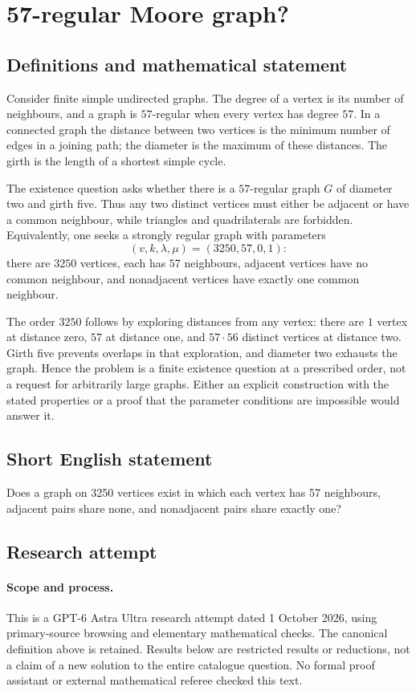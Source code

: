 \documentclass[11pt,a4paper]{article}
\begin{document}
\section*{57-regular Moore graph?}\label{statement}

\subsection{Definitions and mathematical statement}
Consider finite simple undirected graphs. The degree of a vertex is
its number of neighbours, and a graph is $57$-regular when every
vertex has degree $57$. In a connected graph the distance between
two vertices is the minimum number of edges in a joining path;
the diameter is the maximum of these distances. The girth is the
length of a shortest simple cycle.

The existence question asks whether there is a $57$-regular graph
$G$ of diameter two and girth five. Thus any two distinct vertices
must either be adjacent or have a common neighbour, while triangles
and quadrilaterals are forbidden. Equivalently, one seeks a strongly
regular graph with parameters
\[
 (v,k,\lambda,\mu)=(3250,57,0,1):
\]
there are $3250$ vertices, each has $57$ neighbours, adjacent
vertices have no common neighbour, and nonadjacent vertices have
exactly one common neighbour.

The order $3250$ follows by exploring distances from any vertex:
there are $1$ vertex at distance zero, $57$ at distance one, and
$57\cdot56$ distinct vertices at distance two. Girth five prevents
overlaps in that exploration, and diameter two exhausts the graph.
Hence the problem is a finite existence question at a prescribed
order, not a request for arbitrarily large graphs. Either an
explicit construction with the stated properties or a proof that
the parameter conditions are impossible would answer it.
\subsection{Short English statement}
Does a graph on 3250 vertices exist in which each vertex has 57 neighbours, adjacent pairs share none, and nonadjacent pairs share exactly one?
\subsection{Research attempt}
\paragraph{Scope and process.}
This is a GPT-6 Astra Ultra research attempt dated 1 October 2026, using
primary-source browsing and elementary mathematical checks. The canonical
definition above is retained. Results below are restricted results or
reductions, not a claim of a new solution to the entire catalogue question.
No formal proof assistant or external mathematical referee checked this text.
\end{document}
